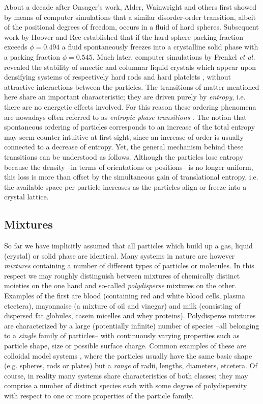 {About a decade after Onsager's work, Alder, Wainwright and others \cite{ALDER57,WOOD57} first showed by means of computer simulations that
a similar disorder-order transition, albeit of the positional degrees of freedom, occurs in a fluid of hard spheres. Subsequent work by
Hoover and Ree \cite{HooverRee} established that if the hard-sphere packing fraction
exceeds $\phi=0.494$ a fluid  spontaneously freezes into a crystalline
solid phase with a packing fraction $\phi=0.545$.
Much later, computer simulations by Frenkel {\em et al.}  revealed the stability
of smectic and columnar liquid crystals which appear upon densifying systems of respectively hard rods \cite{Frenkel88} and
 hard platelets \cite{FrenkelLiqcryst,Veerman},  without  attractive interactions between the particles.
The transitions of matter mentioned here share an important characteristic; they are driven purely by {\em entropy}, i.e. there are no energetic effects involved.
For this reason these ordering phenomena are nowadays
often referred to as {\em entropic phase transitions} \cite{Frenkelsoft}.
The notion that spontaneous ordering
of particles corresponds to an increase of the total entropy  may seem counter-intuitive
at first sight, since an increase  of order is usually connected to a decrease of entropy.
Yet, the general mechanism behind these transitions can be understood as follows.
Although the particles lose entropy because the density --in terms of orientations or positions--
is no longer uniform, this loss is more than offset by the simultaneous gain of translational
entropy, i.e.  the available space per particle increases as the particles align or freeze into
a crystal lattice.

\subsection{Mixtures}

So far we have implicitly assumed that all particles which build up a gas, liquid (crystal) or solid phase
are identical. Many systems in nature are however {\em mixtures} containing a number of different types of
particles or molecules. In this respect we may roughly distinguish
between mixtures of chemically distinct moieties on the one hand and so-called {\em polydisperse} mixtures on
the other. Examples of the first are blood
(containing red and white blood cells, plasma etcetera),
mayonnaise (a mixture of oil and vinegar) and milk (consisting of dispersed fat globules, casein micelles and
whey proteins).
Polydisperse mixtures are characterized by a large (potentially infinite) number of
species --all belonging to a {\em single} family of particles-- with  continuously varying properties such as particle shape, size or possible surface charge.
Common examples of these are colloidal model systems , where the particles usually have the same
basic shape (e.g.  spheres, rods or plates) but  a {\em range} of
radii, lengths, diameters, etcetera. Of course, in reality many systems
share characteristics of both classes; they
may comprise a number of distinct species  each with some degree of polydispersity with respect to
one or more properties of the particle family.

}
